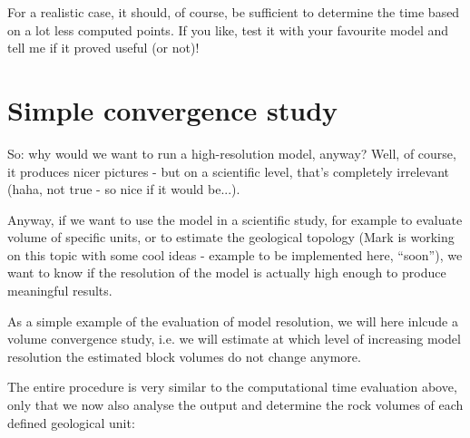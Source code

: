 \documentclass[a4paper,10pt,english]{sphinxmanual}
\begin{document}
For a realistic case, it should, of course, be sufficient to determine
the time based on a lot less computed points. If you like, test it with
your favourite model and tell me if it proved useful (or not)!


\section{Simple convergence study}
\label{notebooks/2-Adjust-input:simple-convergence-study}
So: why would we want to run a high-resolution model, anyway? Well, of
course, it produces nicer pictures - but on a scientific level, that's
completely irrelevant (haha, not true - so nice if it would be...).

Anyway, if we want to use the model in a scientific study, for example
to evaluate volume of specific units, or to estimate the geological
topology (Mark is working on this topic with some cool ideas - example
to be implemented here, ``soon''), we want to know if the resolution of
the model is actually high enough to produce meaningful results.

As a simple example of the evaluation of model resolution, we will here
inlcude a volume convergence study, i.e. we will estimate at which level
of increasing model resolution the estimated block volumes do not change
anymore.

The entire procedure is very similar to the computational time
evaluation above, only that we now also analyse the output and determine
the rock volumes of each defined geological unit:
\end{document}
